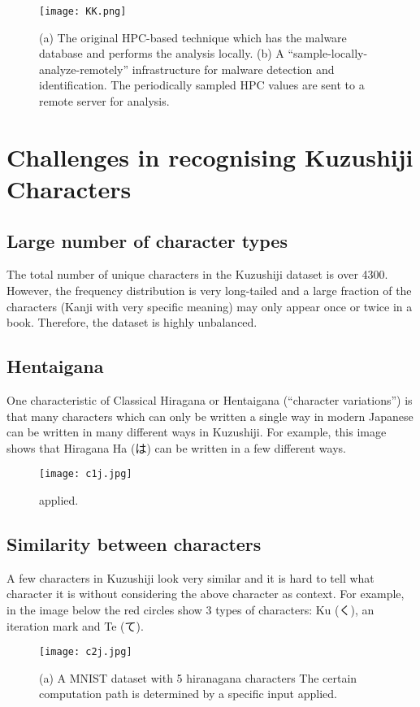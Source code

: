 \documentclass[12pt]{report}
\begin{document}
\begin{figure}[h]
\centering
\texttt{[image: KK.png]}
\caption{(a) The original HPC-based technique which has the malware
database and performs the analysis
locally. (b) A “sample-locally-analyze-remotely” infrastructure for
malware detection and identification. The
periodically sampled HPC values are sent to a remote server for analysis.}
\end{figure}

\section{Challenges in recognising Kuzushiji Characters}
\subsection{Large number of character types}
The total number of unique characters in the Kuzushiji dataset is over
4300. However, the frequency distribution is very long-tailed and a
large fraction of the characters (Kanji with very specific meaning)
may only appear once or twice in a book. Therefore, the dataset is
highly unbalanced.

\subsection{Hentaigana}
One characteristic of Classical Hiragana or Hentaigana (“character
variations'') is that many characters which can only be written a
single way in modern Japanese can be written in many different ways in
Kuzushiji.
For example, this image shows that Hiragana Ha (は) can be written in a
few different ways.

\begin{figure}[h]
\centering
\texttt{[image: c1j.jpg]}
\caption{ applied.}
\end{figure}

\subsection{Similarity between characters}
A few characters in Kuzushiji look very similar and it is hard to tell
what character it is without considering the above character as
context.
For example, in the image below the red circles show 3 types of
characters: Ku (く), an iteration mark and Te (て).
\begin{figure}[h]
\centering
\texttt{[image: c2j.jpg]}
\caption{(a) A MNIST dataset with 5 hiranagana characters
The certain computation path is determined by a specific input applied.}
\end{figure}
\end{document}
